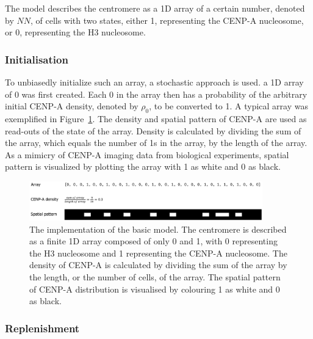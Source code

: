 The model describes the centromere as a 1D array of a certain number, denoted by $NN$, of cells with two states, either 1, representing the CENP-A nucleosome, or 0, representing the H3 nucleosome.

\subsubsection{Initialisation}

To unbiasedly initialize such an array, a stochastic approach is used. a 1D array of 0 was first created. Each 0 in the array then has a probability of the arbitrary initial CENP-A density, denoted by $\rho_{0}$, to be converted to 1. A typical array was exemplified in Figure~\ref{fig:array}. The density and spatial pattern of CENP-A are used as read-outs of the state of the  array. Density is calculated by dividing the sum of the array, which equals the number of 1s in the array, by the length of the array. As a mimicry of CENP-A imaging data from biological experiments, spatial pattern is visualized by plotting the array with 1 as white and 0 as black. 

\begin{figure}[htbp]
  \centering
  \includegraphics[width=0.9\textwidth]{chapter2/figures/the array.pdf}
  \caption[The implementation of the basic model]{The implementation of the basic model. The centromere is described as a finite 1D array composed of only 0 and 1, with 0 representing the H3 nucleosome and 1 representing the CENP-A nucleosome. The density of CENP-A is calculated by dividing the sum of the array by the length, or the number of cells, of the array. The spatial pattern of CENP-A distribution is visualised by colouring 1 as white and 0 as black. }
  \label{fig:array}
\end{figure}

\subsubsection{Replenishment}

